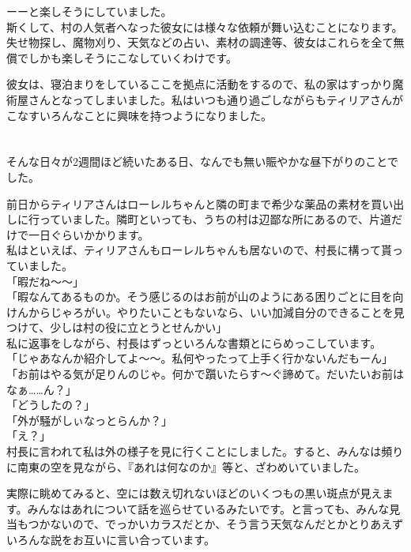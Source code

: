 \documentclass[oneside, a4paper]{jsbook}
\begin{document}
ーーと楽しそうにしていました。\\

斯くして、村の人気者へなった彼女には様々な依頼が舞い込むことになります。失せ物探し、魔物刈り、天気などの占い、素材の調達等、彼女はこれらを全て無償でしかも楽しそうにこなしていくわけです。

彼女は、寝泊まりをしているここを拠点に活動をするので、私の家はすっかり魔術屋さんとなってしまいました。私はいつも通り過ごしながらもティリアさんがこなすいろんなことに興味を持つようになりました。\\\\\\

そんな日々が2週間ほど続いたある日、なんでも無い賑やかな昼下がりのことでした。

前日からティリアさんはローレルちゃんと隣の町まで希少な薬品の素材を買い出しに行っていました。隣町といっても、うちの村は辺鄙な所にあるので、片道だけで一日ぐらいかかります。\\

私はといえば、ティリアさんもローレルちゃんも居ないので、村長に構って貰っていました。\\

\noindent
「暇だね〜〜」\\
「暇なんてあるものか。そう感じるのはお前が山のようにある困りごとに目を向けんからじゃろがい。やりたいこともないなら、いい加減自分のできることを見つけて、少しは村の役に立とうとせんかい」\\

私に返事をしながら、村長はずっといろんな書類とにらめっこしています。\\

\noindent
「じゃあなんか紹介してよ〜〜。私何やったって上手く行かないんだもーん」\\
「お前はやる気が足りんのじゃ。何かで躓いたらす〜ぐ諦めて。だいたいお前はなぁ……ん？」\\
「どうしたの？」\\
「外が騒がしぃなっとらんか？」\\
「え？」\\

村長に言われて私は外の様子を見に行くことにしました。すると、みんなは頻りに南東の空を見ながら、『あれは何なのか』等と、ざわめいていました。

実際に眺めてみると、空には数え切れないほどのいくつもの黒い斑点が見えます。みんなはあれについて話を巡らせているみたいです。と言っても、みんな見当もつかないので、でっかいカラスだとか、そう言う天気なんだとかとりあえずいろんな説をお互いに言い合っています。\\
\end{document}

